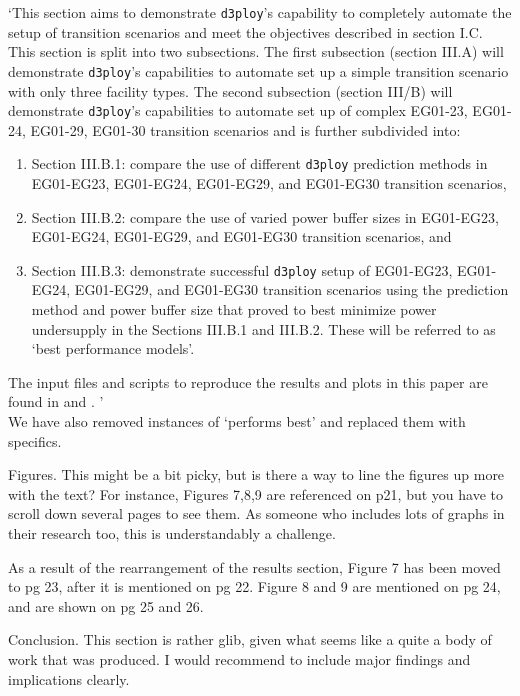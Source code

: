 \documentclass[answers,11pt]{exam}
\newcommand{\deploy}{\texttt{d3ploy}\xspace}%
\begin{document}
\begin{questions}
\begin{solution}
`This section aims to demonstrate \deploy's capability to completely automate the setup of 
transition scenarios and meet the objectives described in section 
I.C. 
This section is split into two subsections. 
The first subsection (section III.A) will demonstrate \deploy's capabilities 
to automate set up a simple transition scenario with only three facility types. 
The second subsection (section III/B) will demonstrate \deploy's capabilities to automate 
set up of complex EG01-23, EG01-24, EG01-29, EG01-30 transition scenarios and is further 
subdivided into:  
\begin{enumerate}
\item Section III.B.1: compare the use of different \deploy prediction methods in EG01-EG23, EG01-EG24, 
EG01-EG29, and EG01-EG30 transition scenarios, 
\item Section III.B.2: compare the use of varied power buffer sizes in EG01-EG23, EG01-EG24, 
EG01-EG29, and EG01-EG30 transition scenarios, and
\item Section III.B.3: demonstrate successful \deploy setup of EG01-EG23, EG01-EG24, 
EG01-EG29, and EG01-EG30 transition scenarios using the prediction method and 
power buffer size that proved to best minimize power undersupply in the Sections 
III.B.1 and III.B.2. 
These will be referred to as `best performance models'. 
\end{enumerate}
The input files and scripts to reproduce the results and plots in this
paper are found in \cite{chee_arfc/d3ploy:_2019} and 
\cite{bae_arfctransition-scenarios_2019}. '
\\

We have also removed instances of `performs best' and replaced them with specifics. 
\end{solution}

\question Figures. This might be a bit picky, but is there a way to line the figures up more with the text? For
instance, Figures 7,8,9 are referenced on p21, but you have to scroll down several pages to see them. As
someone who includes lots of graphs in their research too, this is understandably a challenge.

\begin{solution}
As a result of the rearrangement of the results section, Figure 7 has been moved to pg 23, after 
it is mentioned on pg 22. Figure 8 and 9 are mentioned on pg 24, and are shown on pg 25 and 26.  
\end{solution}

\question Conclusion. This section is rather glib, given what seems like a quite a body of work that was produced.
I would recommend to include major findings and implications clearly.


\end{questions}
\end{document}
